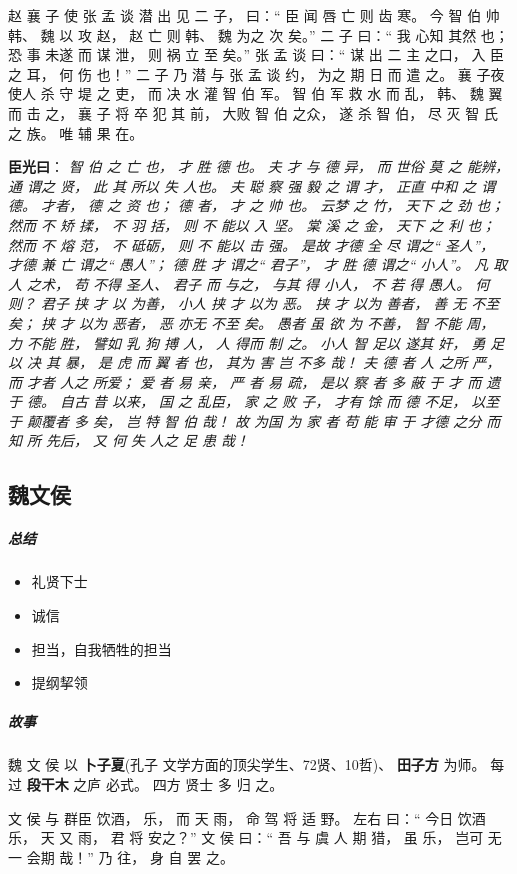 \documentclass[UTF8,a4paper,8pt]{ctexbook}
\begin{document}
				  赵 襄 子 使 张 孟 谈 潜 出 见 二 子， 曰：“ 臣 闻 唇 亡 则 齿 寒。 今 智 伯 帅 韩、 魏 以 攻 赵， 赵 亡 则 韩、 魏 为之 次 矣。” 二 子 曰：“ 我 心知 其然 也； 恐 事 未遂 而 谋 泄， 则 祸 立 至 矣。” 张 孟 谈 曰：“ 谋 出 二 主 之口， 入 臣 之 耳， 何 伤 也！” 二 子 乃 潜 与 张 孟 谈 约， 为之 期 日 而 遣 之。 襄 子夜 使人 杀 守 堤 之 吏， 而 决 水 灌 智 伯 军。 智 伯 军 救 水 而 乱， 韩、 魏 翼 而 击 之， 襄 子 将 卒 犯 其 前， 大败 智 伯 之众， 遂 杀 智 伯， 尽 灭 智 氏 之 族。 唯 辅 果 在。 
				  
				  \textbf{臣光曰}： \textit{智 伯 之 亡 也， 才 胜 德 也。 夫 才 与 德 异， 而 世俗 莫 之 能辨， 通 谓之 贤， 此 其 所以 失 人也。 夫 聪 察 强 毅 之 谓 才， 正直 中和 之 谓 德。 才者， 德 之 资 也； 德 者， 才 之 帅 也。 云梦 之 竹， 天下 之 劲 也； 然而 不 矫 揉， 不 羽 括， 则 不 能以 入 坚。 棠 溪 之 金， 天下 之 利 也； 然而 不 熔 范， 不 砥砺， 则 不 能以 击 强。 是故 才德 全 尽 谓之“ 圣人”， 才德 兼 亡 谓之“ 愚人”； 德 胜 才 谓之“ 君子”， 才 胜 德 谓之“ 小人”。 凡 取 人 之术， 苟 不得 圣人、 君子 而 与之， 与其 得 小人， 不 若 得 愚人。 何 则？ 君子 挟 才 以 为善， 小人 挟 才 以为 恶。 挟 才 以为 善者， 善 无 不至 矣； 挟 才 以为 恶者， 恶 亦无 不至 矣。 愚者 虽 欲 为 不善， 智 不能 周， 力 不能 胜， 譬如 乳 狗 搏 人， 人 得而 制 之。 小人 智 足以 遂其 奸， 勇 足以 决 其 暴， 是 虎 而 翼 者 也， 其为 害 岂 不多 哉！ 夫 德 者 人 之所 严， 而 才者 人之 所爱； 爱 者 易 亲， 严 者 易 疏， 是以 察 者 多 蔽 于 才 而 遗 于 德。 自古 昔 以来， 国 之 乱臣， 家 之 败 子， 才有 馀 而 德 不足， 以至于 颠覆者 多 矣， 岂 特 智 伯 哉！ 故 为国 为 家 者 苟 能 审 于 才德 之分 而知 所 先后， 又 何 失 人之 足 患 哉！}
				  
		\subsection{魏文侯}
			\subparagraph{总结}
				\begin{itemize}[itemindent = 1em]
					\item 礼贤下士
					\item 诚信
					\item 担当，自我牺牲的担当
					\item 提纲挈领
				\end{itemize} 
			
			\subparagraph{故事}
				魏 文 侯 以 \textbf{卜子夏}(孔子 文学方面的顶尖学生、72贤、10哲)、 \textbf{田子方} 为师。 每过 \textbf{段干木} 之庐 必式。 四方 贤士 多 归 之。
				
				文 侯 与 群臣 饮酒， 乐， 而 天 雨， 命 驾 将 适 野。 左右 曰：“ 今日 饮酒 乐， 天 又 雨， 君 将 安之？” 文 侯 曰：“ 吾 与 虞 人 期 猎， 虽 乐， 岂可 无一 会期 哉！” 乃 往， 身 自 罢 之。
				
\end{document}
